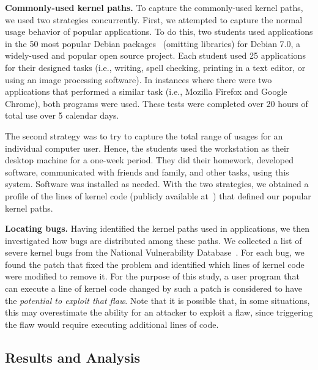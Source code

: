\textbf{Commonly-used kernel paths.}
To capture the commonly-used kernel paths, we used two strategies concurrently.
First, we attempted to capture the normal usage behavior of popular applications.
To do this, two students used applications in the 50 most popular Debian
packages~\cite{Top-Packages} (omitting libraries) for Debian 7.0, a widely-used and
popular open source project.
Each student used 25 applications for their designed
tasks (i.e., writing, spell checking, printing in a text editor, or using
an image processing software). In instances where there were two applications that performed a
similar task (i.e., Mozilla Firefox and Google Chrome), both programs were
used. These tests were completed over 20 hours of
total use over 5 calendar days.

The second strategy was to try to capture the total range of usages for an
individual computer user. Hence, the students used the workstation as their
desktop machine for a one-week period. They did their homework, developed
software, communicated with friends and family, and other tasks, using this system.
Software was installed as needed.
%
With the two strategies, we obtained a profile of the lines of
kernel code (publicly available at~\cite{Lind}) that defined our
popular kernel paths.

\textbf{Locating bugs.}
Having identified the kernel paths used in applications,
we then investigated how bugs are distributed among these paths. We collected a list of
severe kernel bugs from the National Vulnerability Database~\cite{NVD}.
For each bug, we found the patch that fixed the problem and identified
which lines of kernel code were modified to remove it.
For the purpose of this study, a user program that can execute a line of kernel
code changed by such a patch is considered to have the \textit{potential to
exploit that flaw}.  Note that it is possible that, in some situations, this may
overestimate the ability for an attacker to exploit a flaw, since triggering the
flaw would require executing additional lines of code.

\subsection{Results and Analysis}
\label{Verification-of-Hypothesis}


